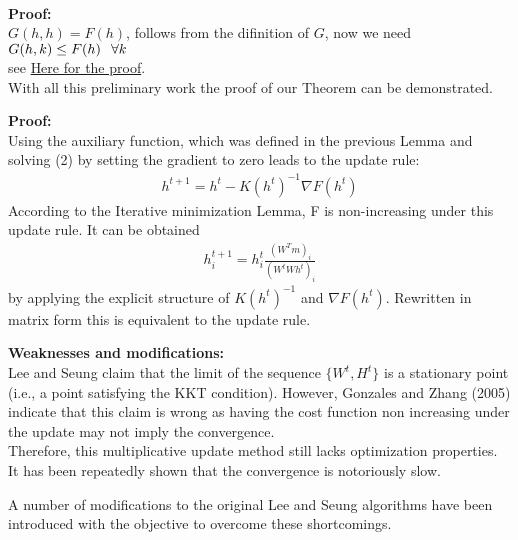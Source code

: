 \documentclass[aspectratio=169]{beamer}
\begin{document}
\begin{spacing}{1.0}
\begin{frame}
\begin{lemma}
\begin{align}
        \end{align}
    \end{lemma}
\end{frame}
\begin{frame}
    \textbf{Proof:}\\
    $G(h, h) = F(h)$, follows from the difinition of $G$, now we need $G(h,k) \leq F(h) \hspace{0.1in} \forall k$\\
    see \href{https://proceedings.neurips.cc/paper/2000/file/f9d1152547c0bde01830b7e8bd60024c-Paper.pdf}
    {Here for the proof}.\\
    With all this preliminary work the proof of our Theorem  can be demonstrated.
\end{frame}
\begin{frame}
        \textbf{Proof:}\\
        Using the auxiliary function, which was defined in the previous Lemma and solving (2)
        by setting the gradient to zero leads to the update rule:
        \begin{align*}
            h^{t+1} = h^{t} - K(h^{t})^{-1}\nabla F(h^{t})
        \end{align*}
        According to the Iterative minimization Lemma, F is non-increasing under this update
        rule. It can be obtained
        \begin{align*}
            h^{t+1}_{i} = h^{t}_{i}\frac{(W^{T}m)_{i}}{(W^{t}Wh^{t})_{i}}
        \end{align*}
        by applying the explicit structure of $K(h^{t})^{-1}$ and $\nabla F(h^{t})$. Rewritten
        in matrix form this is equivalent to the update rule.
\end{frame}
\begin{frame}
    \textbf{Weaknesses and modifications:}\\
    Lee and Seung claim that the limit of the sequence $\{W^{t}, H^{t}\}$ is a 
    stationary point (i.e., a point satisfying the KKT condition). However, Gonzales and Zhang (2005)
    indicate that this claim is wrong as having  the cost function non increasing under the update 
    may not imply the convergence.\\
    Therefore, this multiplicative update method still lacks optimization properties.\\
    It has been repeatedly shown that the convergence is notoriously slow.
    
    A number of modifications to the original Lee and Seung algorithms have been
    introduced with the objective to overcome these shortcomings.\\


\end{frame}
\end{spacing}
\end{document}
